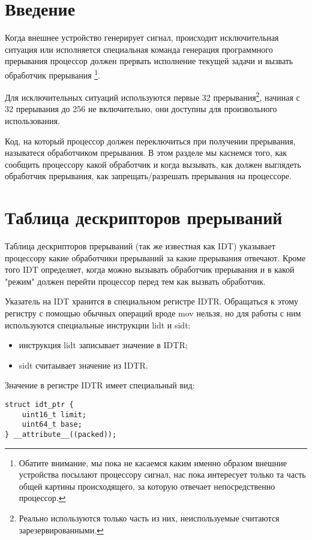 \section{Введение}

Когда внешнее устройство генерирует сигнал, происходит исключительная ситуация
или исполняется специальная команда генерация программного прерывания процессор
должен прервать исполнение текущей задачи и вызвать обработчик прерывания
\footnote{Обатите внимание, мы пока не касаемся каким именно образом внешние
устройства посылают процессору сигнал, нас пока интересует только та часть общей
картины происходящего, за которую отвечает непосредственно процессор.}.

Для исключительных ситуаций используются первые 32 прерывания\footnote{Реально
используются только часть из них, неиспользуемые считаются зарезервированными.},
начиная с 32 прерывания до 256 не включительно, они доступны для произвольного
использования.

Код, на который процессор должен переключиться при получении прерывания,
называтеся обработчиком прерывания. В этом разделе мы каснемся того, как
сообщить процессору какой обработчик и когда вызывать, как должен выглядеть
обработчик прерывания, как запрещать/разрешать прерывания на процессоре.

\section{Таблица дескрипторов прерываний}

Таблица дескрипторов прерываний (так же известная как IDT) указывает процессору
какие обработчики прерываний за какие прерывания отвечают. Кроме того IDT
определяет, когда можно вызывать обработчик прерывания и в какой "режим" должен
перейти процессор перед тем как вызвать обработчик.

Указатель на IDT хранится в специальном регистре IDTR. Обращаться к этому
регистру с помощью обычных операций вроде mov нельзя, но для работы с ним
используются специальные инструкции lidt и sidt:

\begin{itemize}
  \item инструкция lidt записывает значение в IDTR;
  \item sidt считаывает значение из IDTR.
\end{itemize}

Значение в регистре IDTR имеет специальный вид:

\begin{lstlisting}
struct idt_ptr {
	uint16_t limit;
	uint64_t base;
} __attribute__((packed));
\end{lstlisting}

